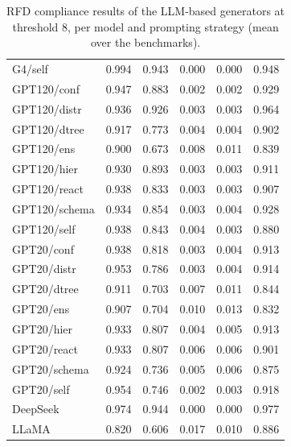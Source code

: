 \begin{table}[t]
\begin{tabular}{lrrrrr}
G4/self & 0.994 & 0.943 & 0.000 & 0.000 & 0.948 \\
GPT120/conf & 0.947 & 0.883 & 0.002 & 0.002 & 0.929 \\
GPT120/distr & 0.936 & 0.926 & 0.003 & 0.003 & 0.964 \\
GPT120/dtree & 0.917 & 0.773 & 0.004 & 0.004 & 0.902 \\
GPT120/ens & 0.900 & 0.673 & 0.008 & 0.011 & 0.839 \\
GPT120/hier & 0.930 & 0.893 & 0.003 & 0.003 & 0.911 \\
GPT120/react & 0.938 & 0.833 & 0.003 & 0.003 & 0.907 \\
GPT120/schema & 0.934 & 0.854 & 0.003 & 0.004 & 0.928 \\
GPT120/self & 0.938 & 0.843 & 0.004 & 0.003 & 0.880 \\
GPT20/conf & 0.938 & 0.818 & 0.003 & 0.004 & 0.913 \\
GPT20/distr & 0.953 & 0.786 & 0.003 & 0.004 & 0.914 \\
GPT20/dtree & 0.911 & 0.703 & 0.007 & 0.011 & 0.844 \\
GPT20/ens & 0.907 & 0.704 & 0.010 & 0.013 & 0.832 \\
GPT20/hier & 0.933 & 0.807 & 0.004 & 0.005 & 0.913 \\
GPT20/react & 0.933 & 0.807 & 0.006 & 0.006 & 0.901 \\
GPT20/schema & 0.924 & 0.736 & 0.005 & 0.006 & 0.875 \\
GPT20/self & 0.954 & 0.746 & 0.002 & 0.003 & 0.918 \\
\midrule
DeepSeek & 0.974 & 0.944 & 0.000 & 0.000 & 0.977 \\
LLaMA & 0.820 & 0.606 & 0.017 & 0.010 & 0.886 \\
\bottomrule
\end{tabular}
\caption{RFD compliance results of the LLM-based generators at threshold 8, per model and prompting strategy (mean over the benchmarks).}
\label{tab:rfdcompliance_llm_thr8}
\end{table}